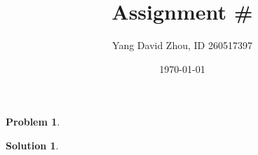 \documentclass{article}
\newtheorem{problem}{Problem}
\theoremstyle{definition}
\newtheorem*{solution}{Solution}
\begin{document}
 \title{Assignment #} 

\author{Yang David Zhou, ID 260517397} 

\date{\today}

\maketitle

\begin{problem} 

\end{problem}

\begin{solution}

\end{solution}
\end{document}
